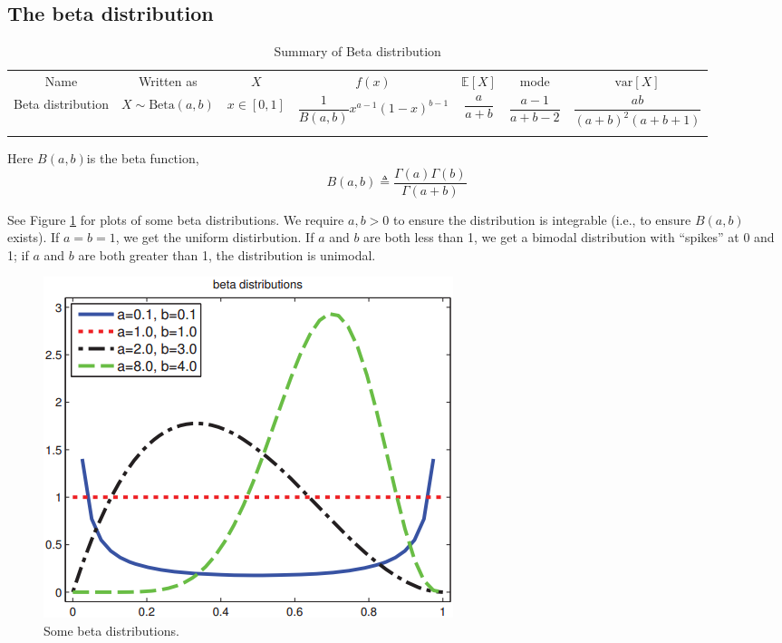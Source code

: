 \documentclass[graybox, envcountchap, twocolumn]{styles/svmult}
\begin{document}
\subsection{The beta distribution}

\begin{table}
\caption{Summary of Beta distribution}\label{tab:beta-distribution}
\centering
\begin{tabular}{ccccccc}
\hline\noalign{\smallskip}
Name & Written as & $X$ & $f(x)$ & $\mathbb{E}[X]$ & mode & $\text{var}[X]$ \\
\noalign{\smallskip}\svhline\noalign{\smallskip}
Beta distribution & $X \sim \text{Beta}(a,b)$ & $x \in [0,1]$ & $\dfrac{1}{B(a,b)}x^{a-1}(1-x)^{b-1}$ & $\dfrac{a}{a+b}$ & $\dfrac{a-1}{a+b-2}$ & $\dfrac{ab}{(a+b)^2(a+b+1)}$ \\
\noalign{\smallskip}\hline
\end{tabular}
\end{table} 

Here $B(a, b)$is the beta function,
\begin{equation}
B(a,b) \triangleq \dfrac{\Gamma(a)\Gamma(b)}{\Gamma(a+b)}
\end{equation}

See Figure \ref{fig:beta-distribution} for plots of some beta distributions. We require  $a, b >0$ to ensure the distribution is integrable (i.e., to ensure $B(a, b)$ exists). If $a=b=1$, we get the uniform distirbution. If $a$ and $b$ are both less than 1, we get a bimodal distribution with “spikes” at 0 and 1; if $a$ and $b$ are both greater than 1, the distribution is unimodal.

\begin{figure}[hbtp]
\centering
    \includegraphics[scale=.60]{beta-distribution.png}
\caption{Some beta distributions.}
\label{fig:beta-distribution} 
\end{figure}
\end{document}
